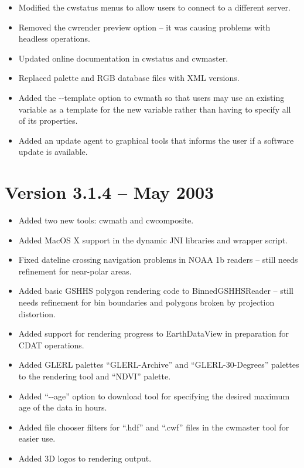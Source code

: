 \begin{itemize}
  \item Modified the cwstatus menus to allow users to connect to a
  different server.

  \item Removed the cwrender preview option -- it was causing problems
  with headless operations.

  \item Updated online documentation in cwstatus and cwmaster.

  \item Replaced palette and RGB database files with XML versions.

  \item Added the -{-}template option to cwmath so that users may use an
  existing variable as a template for the new variable rather than
  having to specify all of its properties.

  \item Added an update agent to graphical tools that informs the user
  if a software update is available.

\end{itemize}


\section{Version 3.1.4 -- May 2003}

\begin{itemize}

  \item Added two new tools: cwmath and cwcomposite.

  \item Added MacOS X support in the dynamic JNI libraries and wrapper
  script.

  \item Fixed dateline crossing navigation problems in NOAA 1b readers
  -- still needs refinement for near-polar areas.

  \item Added basic GSHHS polygon rendering code to BinnedGSHHSReader
  -- still needs refinement for bin boundaries and polygons broken by
  projection distortion.

  \item Added support for rendering progress to EarthDataView in
  preparation for CDAT operations.

  \item Added GLERL palettes ``GLERL-Archive'' and
  ``GLERL-30-Degrees'' palettes to the rendering tool and ``NDVI''
  palette.

  \item Added ``-{-}age'' option to download tool for specifying the
  desired maximum age of the data in hours.

  \item Added file chooser filters for ``.hdf'' and ``.cwf'' files in
  the cwmaster tool for easier use.

  \item Added 3D logos to rendering output.

\end{itemize}

